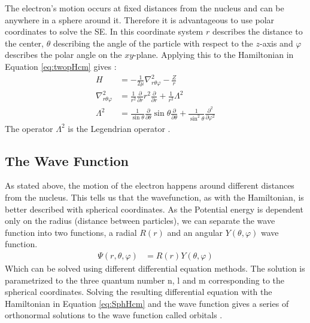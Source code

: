 \documentclass[../master_thesis.tex]{subfiles}
\begin{document}
The electron's motion occurs at fixed distances from the nucleus and can be
anywhere in a sphere around it. Therefore it is advantageous to use polar
coordinates to solve the \ac{SE}. In this coordinate system $r$ describes the
distance to the center, $\theta$ describing the angle of the particle with
respect to the $z$-axis and $\varphi$ describes the polar angle on the
$xy$-plane. Applying this to the Hamiltonian in Equation \ref{eq:twopHcm} gives
\cite{Atkins:2014}:
\begin{equation}
  \begin{split}\label{eq:SphHcm}
    H &= -\frac{1}{2\mu}\nabla^2_{r\theta\varphi} - \frac{Z}{r}\\
    \nabla^2_{r\theta\varphi} &=  \frac{1}{r^2}\frac{\partial}{\partial r}
                                  r^2\frac{\partial}{\partial r}
                                  + \frac{1}{r^2}\Lambda^2 \\
    \Lambda^2 &= \frac{1}{\sin{\theta}}\frac{\partial}{
                 \partial\theta}\sin{\theta}\frac{\partial}{\partial\theta}
                 + \frac{1}{\sin^2{\theta}}\frac{\partial^2}{\partial\varphi^2}
  \end{split}
\end{equation}
The operator $\Lambda^2$ is the Legendrian operator \cite{Atkins:2014}.

\subsection{The Wave Function}
As stated above, the motion of the electron happens around different distances
from the nucleus. This tells us that the wavefunction, as with the Hamiltonian,
is better described with spherical coordinates. As the Potential energy is
dependent only on the radius (distance between particles), we can separate the
wave function into two functions, a radial $R(r)$ and an angular
$Y(\theta, \varphi)$ wave function.
\begin{equation}
  \begin{split}
    \Psi(r, \theta, \varphi) &= R(r) Y(\theta, \varphi)
  \end{split}
\end{equation}
Which can be solved using different differential equation methods. The solution
is parametrized to the three quantum number n, l and m corresponding to the
spherical coordinates. Solving the resulting differential equation with the
Hamiltonian in Equation \ref{eq:SphHcm} and the wave function gives a series of
orthonormal solutions to the wave function called orbitals \cite{Jensen:2017}.
\end{document}
